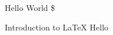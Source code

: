 \documentclass{beamer}
\begin{document}
	\begin{frame}
		Hello World \$
	\end{frame}
	\begin{frame}{Introduction to \LaTeX{}}
	Hello
	\end{frame}
\end{document}
